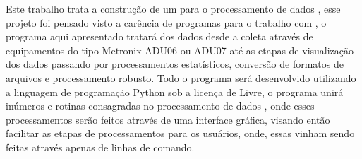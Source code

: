     Este trabalho trata a construção de um  para o processamento de dados \MT, esse projeto foi pensado visto a carência de programas para o trabalho com \MT, o programa aqui apresentado tratará dos dados desde a coleta através de equipamentos do tipo Metronix ADU06 ou ADU07 até as etapas de visualização dos dados passando por processamentos estatísticos, conversão de formatos de arquivos e processamento robusto.
    Todo o programa será desenvolvido utilizando a linguagem de programação Python sob a licença de  Livre, o programa unirá inúmeros  e rotinas consagradas no processamento de dados \MT, onde esses processamentos serão feitos através de uma interface gráfica, visando então facilitar as etapas de processamentos para os usuários, onde, essas vinham sendo feitas através apenas de linhas de comando.%
